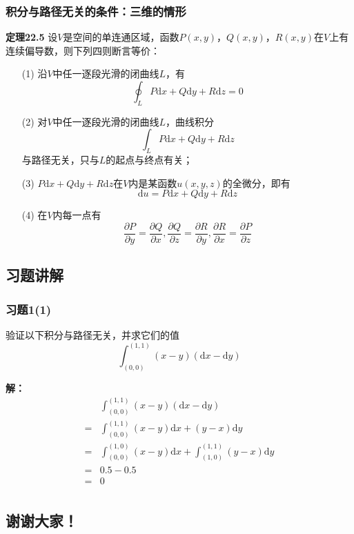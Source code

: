 \documentclass[xetex]{beamer}
\begin{document}
	\begin{frame}
		\frametitle{积分与路径无关的条件：三维的情形}
		\textbf{定理22.5}
			设$V$是空间的单连通区域，函数$P(x, y)$，$Q(x, y)$，$R(x, y)$在$V$上有连续偏导数，则下列四则断言等价：
			\begin{itemize}
				\item[(1)] 沿$V$中任一逐段光滑的闭曲线$L$，有
				\begin{equation*}
				\oint_L P\mathrm{d}x + Q\mathrm{d}y + R\mathrm{d}z = 0
				\end{equation*}
				\item[(2)]对$V$中任一逐段光滑的闭曲线$L$，曲线积分
				\begin{equation*}
				\int_L P\mathrm{d}x + Q\mathrm{d}y+ R\mathrm{d}z
				\end{equation*}
				与路径无关，只与$L$的起点与终点有关；
				\item[(3)]$P\mathrm{d}x + Q\mathrm{d}y+ R\mathrm{d}z$在$V$内是某函数$u(x, y, z)$的全微分，即有
				\begin{equation*}
				\mathrm{d}u = P\mathrm{d}x + Q\mathrm{d}y + R\mathrm{d}z
				\end{equation*}
				\item[(4)] 在$V$内每一点有
				\begin{equation*}
				\frac{\partial P}{\partial y} = \frac{\partial Q}{\partial x}, 
				\frac{\partial Q}{\partial z} = \frac{\partial R}{\partial y},
				\frac{\partial R}{\partial x} = \frac{\partial P}{\partial z}
				\end{equation*}
			\end{itemize}
			
	\end{frame}
	
	\begin{frame}
		\section{习题讲解}
	\end{frame}
	
	\begin{frame}
		\frametitle{习题1(1)}
		验证以下积分与路径无关，并求它们的值
		\begin{equation*}
			\int_{(0,0)}^{(1,1)} (x - y) (\mathrm{d}x - \mathrm{d}y)
		\end{equation*}
		
		\textbf{解：}
			\begin{equation*}
			  \begin{split}
			    &\int_{(0,0)}^{(1,1)} (x - y) (\mathrm{d}x - \mathrm{d}y) \\
			  = &\int_{(0,0)}^{(1,1)} (x - y)\mathrm{d}x + (y- x)\mathrm{d}y \\
			  = &\int_{(0, 0)}^{(1, 0)}  (x - y)\mathrm{d}x + \int_{(1, 0)}^{(1, 1)} (y - x) \mathrm{d}y\\
			  = &0.5 - 0.5\\
			  = &0\\
			  \end{split}
			\end{equation*}
	\end{frame}
	
	\begin{frame}
		\section{谢谢大家！}
	\end{frame}
\end{document}
